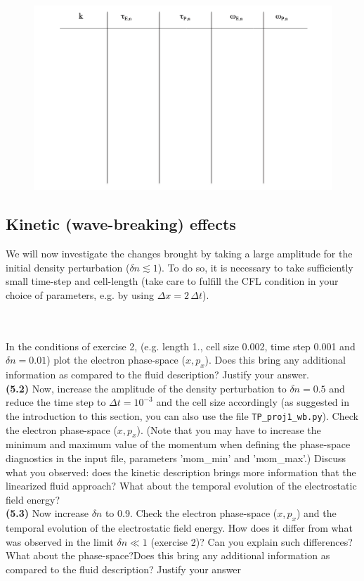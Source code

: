 \documentclass[10pt]{article}
\begin{document}
\begin{figure}
\resizebox{!}{110mm}
{\includegraphics{table_k.png}}
\end{figure}

\subsection{Kinetic (wave-breaking) effects}

We will now investigate the changes brought by taking a large amplitude for the initial density perturbation ($\delta n \lesssim 1$). To do so, it is necessary to take sufficiently small time-step and cell-length (take care to fulfill the CFL condition in your choice of parameters, e.g. by using $\Delta x = 2\,\Delta t $).

$ $\\
\\
  In the conditions of exercise 2, (e.g. length 1., cell size 0.002, time step 0.001 and $\delta n = 0.01$) plot the electron phase-space ($x,p_x$). Does this bring any additional information as compared to the fluid description? Justify your answer.\\
{\bf (5.2)} Now, increase the amplitude of the density perturbation to $\delta n = 0.5$ and reduce the time step to $\Delta t =  10^{-3}$ and the cell size accordingly (as suggested in the introduction to this section, you can also use the file \texttt{TP\_proj1\_wb.py}). Check  the electron phase-space ($x,p_x$). (Note that you may have to increase the minimum and maximum value of the momentum when defining the phase-space diagnostics in the input file, parameters 'mom\_min' and 'mom\_max'.) Discuss what you observed: does the kinetic description brings more information that the linearized fluid approach? What about the temporal evolution of the electrostatic field energy?\\
{\bf (5.3)} Now increase $\delta n$ to 0.9. Check the  electron phase-space ($x,p_x$) and the temporal evolution of the electrostatic field energy. How does it differ from what was observed in the limit $\delta n \ll 1$ (exercise 2)? Can you explain such differences? What about the phase-space?Does this bring any additional information as compared to the fluid description? Justify your answer\\
\end{document}
